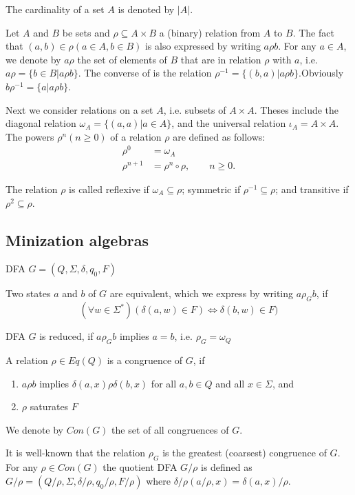 The cardinality of a set $A$ is denoted by $|A|$. 

Let $A$ and $B$ be sets and $\rho\subseteq A\times B$ a (binary) relation from $A$ to $B$. The fact that $(a,b)\in\rho (a\in A,b\in B)$ is also expressed by writing $a\rho b$. For any $a\in A$, we denote by $a\rho$ the set of elements of $B$ that are in relation $\rho$ with $a$, i.e. $a\rho=\{b\in B|a\rho b\}$. The converse of is the relation $\rho^{-1}=\{(b,a)|a\rho b\}$.Obviously $b\rho^{-1}=\{a|a\rho b\}$.

Next we consider relations on a set $A$, i.e. subsets of $A\times A$.
Theses include the diagonal relation $\omega_A=\{(a,a)|a\in A \}$, and the universal relation $\iota_A=A\times A$. The powers $\rho^n(n\ge 0)$ of a relation $\rho$ are defined as follows:
\begin{align*}
\rho^0 &=\omega_A \\
\rho^{n+1} &=\rho^n\circ \rho, \qquad n\ge 0.
\end{align*}

The relation $\rho$ is called reflexive if $\omega_A\subseteq\rho$; symmetric if $\rho^{-1}\subseteq\rho$; and transitive if $\rho^2\subseteq\rho$.

\subsection{Minization algebras}

DFA $G=(Q,\Sigma,\delta,q_0,F)$

Two states $a$ and $b$ of $G$ are equivalent, which we express by writing $a\rho_G b$, if 
\[(\forall w\in \Sigma^\ast) (\delta(a,w)\in F)\Leftrightarrow\delta(b,w)\in F) \]

DFA $G$ is reduced, if $a\rho_G b$ implies $a=b$, i.e. $\rho_G=\omega_Q$

A relation $\rho\in Eq(Q)$ is a congruence of $G$, if 
\begin{enumerate}[(1) ]
	\item $a\rho b$ implies $\delta(a,x)\rho\delta(b,x)$ for all $a,b\in Q$ and all $x\in \Sigma$, and
	\item $\rho$ saturates $F$ 
\end{enumerate} 

We denote by $Con(G)$ the set of all congruences of $G$. 

It is well-known that the relation $\rho_G$ is the greatest (coarsest)  congruence of $G$. For any $\rho\in Con(G)$ the quotient DFA 
$G/\rho$ is defined as $G/\rho=(Q/\rho,\Sigma,\delta/\rho,q_0/\rho,F/\rho)$ where $\delta/\rho(a/\rho,x)=\delta(a,x)/\rho$. 

